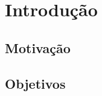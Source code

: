 \chapter{Introdução}

\section{Motivação}
\label{motivacao}


\section{Objetivos}
\label{objetivos}




